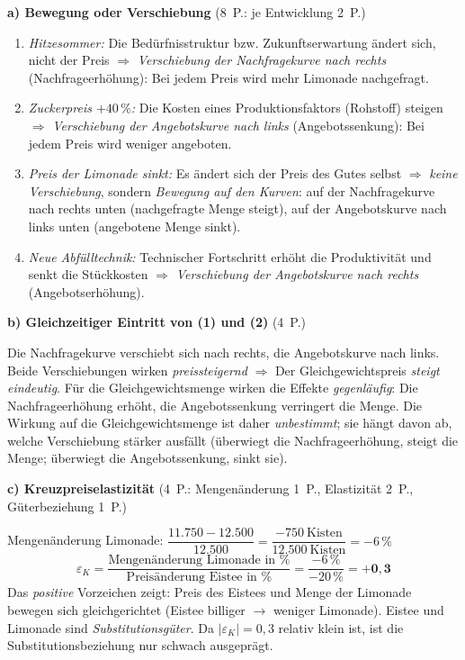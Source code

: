 \begin{loesung}[title={Lösung Aufgabe~1.5 --- Kurvenverschiebungen und Kreuzpreiselastizität}]
\textbf{a) Bewegung oder Verschiebung} \hfill (8~P.: je Entwicklung 2~P.)
\begin{enumerate}[label=(\arabic*)]
  \item \emph{Hitzesommer:} Die Bedürfnisstruktur bzw. Zukunftserwartung ändert sich,
    nicht der Preis $\Rightarrow$ \emph{Verschiebung der Nachfragekurve nach rechts}
    (Nachfrageerhöhung): Bei jedem Preis wird mehr Limonade nachgefragt.
  \item \emph{Zuckerpreis $+40\,\%$:} Die Kosten eines Produktionsfaktors (Rohstoff)
    steigen $\Rightarrow$ \emph{Verschiebung der Angebotskurve nach links}
    (Angebotssenkung): Bei jedem Preis wird weniger angeboten.
  \item \emph{Preis der Limonade sinkt:} Es ändert sich der Preis des Gutes selbst
    $\Rightarrow$ \emph{keine Verschiebung}, sondern \emph{Bewegung auf den Kurven}:
    auf der Nachfragekurve nach rechts unten (nachgefragte Menge steigt), auf der
    Angebotskurve nach links unten (angebotene Menge sinkt).
  \item \emph{Neue Abfülltechnik:} Technischer Fortschritt erhöht die Produktivität und
    senkt die Stückkosten $\Rightarrow$ \emph{Verschiebung der Angebotskurve nach rechts}
    (Angebotserhöhung).
\end{enumerate}

\textbf{b) Gleichzeitiger Eintritt von (1) und (2)} \hfill (4~P.)

Die Nachfragekurve verschiebt sich nach rechts, die Angebotskurve nach links. Beide
Verschiebungen wirken \emph{preissteigernd} $\Rightarrow$ Der Gleichgewichtspreis
\emph{steigt eindeutig}. Für die Gleichgewichtsmenge wirken die Effekte
\emph{gegenläufig}: Die Nachfrageerhöhung erhöht, die Angebotssenkung verringert die
Menge. Die Wirkung auf die Gleichgewichtsmenge ist daher \emph{unbestimmt}; sie hängt
davon ab, welche Verschiebung stärker ausfällt (überwiegt die Nachfrageerhöhung, steigt
die Menge; überwiegt die Angebotssenkung, sinkt sie).

\textbf{c) Kreuzpreiselastizität} \hfill (4~P.: Mengenänderung 1~P., Elastizität 2~P.,
Güterbeziehung 1~P.)

Mengenänderung Limonade: $\dfrac{11.750 - 12.500}{12.500} = \dfrac{-750~\text{Kisten}}{12.500~\text{Kisten}} = -6\,\%$
\[
\varepsilon_K = \frac{\text{Mengenänderung Limonade in \%}}{\text{Preisänderung Eistee in \%}}
= \frac{-6\,\%}{-20\,\%} = \mathbf{+0{,}3}
\]
Das \emph{positive} Vorzeichen zeigt: Preis des Eistees und Menge der Limonade bewegen
sich gleichgerichtet (Eistee billiger $\rightarrow$ weniger Limonade). Eistee und Limonade
sind \emph{Substitutionsgüter}. Da $|\varepsilon_K| = 0{,}3$ relativ klein ist, ist die
Substitutionsbeziehung nur schwach ausgeprägt.
\end{loesung}

